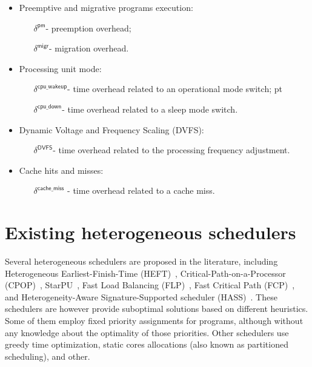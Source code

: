 \begin{itemize}
\item Preemptive and migrative programs execution:
%
\begin{itemize}
\itemindent=8pt
\item[$\delta^{\mathsf{pm}}$\--] preemption overhead;
\itemindent=12pt
\item[$\delta^{\mathsf{migr}}$\--] migration overhead.
\end{itemize}

\item Processing unit mode:
%
\begin{itemize}
\itemindent=37pt
\item[$\delta^\mathsf{{cpu\_wakeup}}$\--] time overhead related to an operational mode switch;
	pt
\item[$\delta^\mathsf{{cpu\_down}}$\--] time overhead related to a sleep mode switch.
\end{itemize}

\item Dynamic Voltage and Frequency Scaling (DVFS):
%
\begin{itemize}
\itemindent=18pt
\item[$\delta^\mathsf{{DVFS}}$\--] time overhead related to the processing frequency adjustment.
\end{itemize}

\item Cache hits and misses:
%
\begin{itemize}
\itemindent=40pt
\item[$\delta^\mathsf{{cache\_miss}}$ \--] time overhead related to a cache miss.
\end{itemize}
\end{itemize}

\section{Existing heterogeneous schedulers}
\label{sec:existingSchedulers}

Several heterogeneous schedulers are proposed in the literature, including 
Heterogeneous Earliest-Finish-Time (HEFT)~\cite{Topcuoglu1999, Topcuoglu2002, Bittencourt2010, Samadi2018},
Critical-Path-on-a-Processor (CPOP)~\cite{Topcuoglu2002, Topcuoglu1999}, 
StarPU~\cite{Augonnet2009}, 
Fast Load Balancing (FLP)~\cite{Radulescu1999, Radulescu2000}, 
Fast Critical Path (FCP)~\cite{Radulescu1999_FCP, Radulescu2000}, and 
Heterogeneity-Aware Signature-Supported scheduler (HASS)~\cite{Shelepov2009}. 
These schedulers are however provide suboptimal solutions based on different heuristics. Some of them employ fixed priority assignments for programs, although without any knowledge about the optimality of those priorities. Other schedulers use greedy time optimization, static cores allocations (also known as partitioned scheduling), and other.